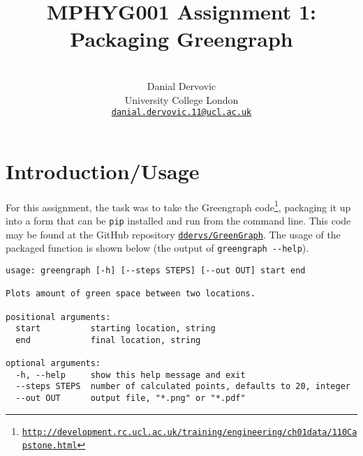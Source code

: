 \documentclass{article}
\title{MPHYG001 Assignment 1: Packaging Greengraph}
\author{\\
Danial Dervovic\\
\normalsize University College London\\
\normalsize \href{mailto:danial.dervovic.11@ucl.ac.uk}{\texttt{danial.dervovic.11@ucl.ac.uk}}
}
\begin{document}
\maketitle
\section*{Introduction/Usage}
For this assignment, the task was to take the Greengraph code\footnote{\href{http://development.rc.ucl.ac.uk/training/engineering/ch01data/110Capstone.html}{\texttt{http://development.rc.ucl.ac.uk/training/engineering/ch01data/110Capstone.html}}}, packaging it up into a form that can be \texttt{pip} installed and run from the command line. This code may be found at the GitHub repository \href{https://github.com/ddervs/GreenGraph}{\texttt{ddervs/GreenGraph}}. The usage of the packaged function is shown below (the output of \texttt{greengraph -{}-help}).

\begin{lstlisting}
usage: greengraph [-h] [--steps STEPS] [--out OUT] start end

Plots amount of green space between two locations.

positional arguments:
  start          starting location, string
  end            final location, string

optional arguments:
  -h, --help     show this help message and exit
  --steps STEPS  number of calculated points, defaults to 20, integer
  --out OUT      output file, "*.png" or "*.pdf"
\end{lstlisting}
\end{document}
